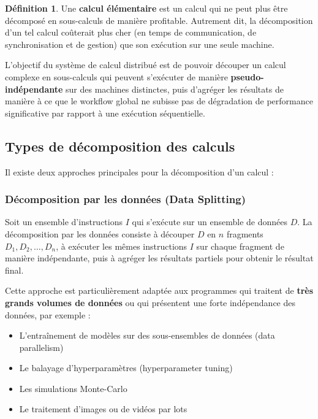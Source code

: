 \documentclass[12pt,a4paper]{report}
\theoremstyle{definition}
\newtheorem{definition}{Définition}[section]
\begin{document}
\begin{definition}
Une \textbf{calcul élémentaire} est un calcul qui ne peut plus être décomposé en sous-calculs de manière profitable. Autrement dit, la décomposition d'un tel calcul coûterait plus cher (en temps de communication, de synchronisation et de gestion) que son exécution sur une seule machine.
\end{definition}

L'objectif du système de calcul distribué est de pouvoir découper un calcul complexe en sous-calculs qui peuvent s'exécuter de manière \textbf{pseudo-indépendante} sur des machines distinctes, puis d'agréger les résultats de manière à ce que le workflow global ne subisse pas de dégradation de performance significative par rapport à une exécution séquentielle.

\subsection{Types de décomposition des calculs}

Il existe deux approches principales pour la décomposition d'un calcul :

\subsubsection{Décomposition par les données (Data Splitting)}

Soit un ensemble d'instructions \( I \) qui s'exécute sur un ensemble de données \( D \).  
La décomposition par les données consiste à découper \( D \) en \( n \) fragments \( D_1, D_2, \dots, D_n \), à exécuter les mêmes instructions \( I \) sur chaque fragment de manière indépendante, puis à agréger les résultats partiels pour obtenir le résultat final.

Cette approche est particulièrement adaptée aux programmes qui traitent de \textbf{très grands volumes de données} ou qui présentent une forte indépendance des données, par exemple :
\begin{itemize}
    \item[$\bullet$] L'entraînement de modèles sur des sous-ensembles de données (data parallelism)
    \item[$\bullet$] Le balayage d'hyperparamètres (hyperparameter tuning)
    \item[$\bullet$] Les simulations Monte-Carlo
    \item [$\bullet$]Le traitement d'images ou de vidéos par lots
\end{itemize}
\end{document}
